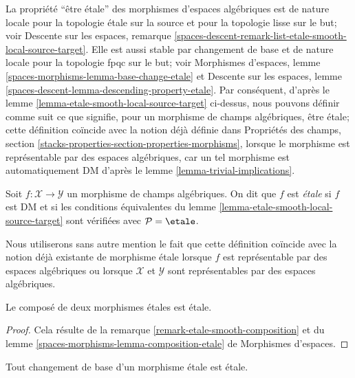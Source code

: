 \medskip\noindent
La propri\'et\'e ``\^etre \'etale'' des morphismes d'espaces alg\'ebriques
est de nature locale pour la topologie \'etale sur la source et pour la topologie lisse
sur le but; voir Descente sur les espaces, remarque
\ref{spaces-descent-remark-list-etale-smooth-local-source-target}.
Elle est aussi stable par changement de base et de nature locale pour la topologie fpqc sur le but; voir
Morphismes d'espaces,
lemme \ref{spaces-morphisms-lemma-base-change-etale}
et
Descente sur les espaces,
lemme \ref{spaces-descent-lemma-descending-property-etale}.
Par cons\'equent, d'apr\`es
le lemme \ref{lemma-etale-smooth-local-source-target}
ci-dessus, nous pouvons d\'efinir comme suit ce que signifie, pour un morphisme
de champs alg\'ebriques, \^etre \'etale; cette d\'efinition co\"incide avec la notion
d\'ej\`a d\'efinie dans Propri\'et\'es des champs, section
\ref{stacks-properties-section-properties-morphisms},
lorsque le morphisme est repr\'esentable par des espaces alg\'ebriques,
car un tel morphisme est automatiquement DM d'apr\`es
le lemme \ref{lemma-trivial-implications}.

\begin{definition}
\label{definition-etale}
Soit $f : \mathcal{X} \to \mathcal{Y}$ un morphisme de champs alg\'ebriques.
On dit que $f$ est {\it \'etale} si $f$ est DM et si les conditions \'equivalentes du
lemme \ref{lemma-etale-smooth-local-source-target}
sont v\'erifi\'ees avec $\mathcal{P} = \etale$.
\end{definition}

\noindent
Nous utiliserons sans autre mention le fait que cette d\'efinition co\"incide avec la notion
d\'ej\`a existante de morphisme \'etale lorsque $f$ est repr\'esentable
par des espaces alg\'ebriques ou lorsque $\mathcal{X}$ et $\mathcal{Y}$ sont
repr\'esentables par des espaces alg\'ebriques.

\begin{lemma}
\label{lemma-composition-etale}
Le compos\'e de deux morphismes \'etales est \'etale.
\end{lemma}

\begin{proof}
Cela résulte de la remarque \ref{remark-etale-smooth-composition}
et du lemme \ref{spaces-morphisms-lemma-composition-etale} de
Morphismes d'espaces.
\end{proof}

\begin{lemma}
\label{lemma-base-change-etale}
Tout changement de base d'un morphisme \'etale est \'etale.
\end{lemma}

